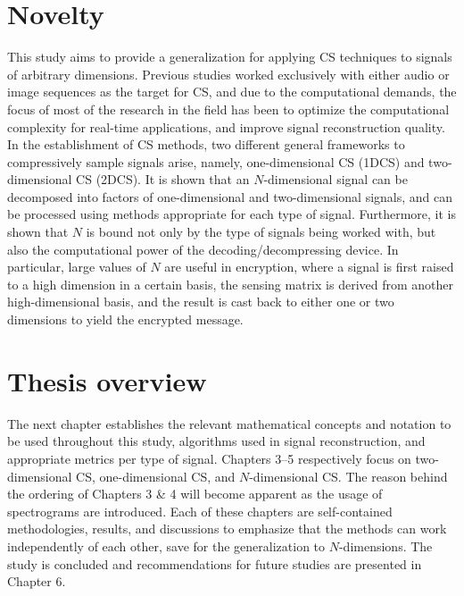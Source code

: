 \section{Novelty}
\label{sec:novel}
This study aims to provide a generalization for applying CS techniques to signals of arbitrary dimensions. Previous studies worked exclusively with either audio or image sequences as the target for CS, and due to the computational demands, the focus of most of the research in the field has been to optimize the computational complexity for real-time applications, and improve signal reconstruction quality. In the establishment of CS methods, two different general frameworks to compressively sample signals arise, namely, one-dimensional CS (1DCS) and two-dimensional CS (2DCS). It is shown that an $N$-dimensional signal can be decomposed into factors of one-dimensional and two-dimensional signals, and can be processed using methods appropriate for each type of signal. Furthermore, it is shown that $N$ is bound not only by the type of signals being worked with, but also the computational power of the decoding/decompressing device. In particular, large values of $N$ are useful in encryption, where a signal is first raised to a high dimension in a certain basis, the sensing matrix is derived from another high-dimensional basis, and the result is cast back to either one or two dimensions to yield the encrypted message.


\section{Thesis overview}
\label{sec:overview}
The next chapter establishes the relevant mathematical concepts and notation to be used throughout this study, algorithms used in signal reconstruction, and appropriate metrics per type of signal. Chapters 3--5 respectively focus on two-dimensional CS, one-dimensional CS, and $N$-dimensional CS. The reason behind the ordering of Chapters 3 \& 4 will become apparent as the usage of spectrograms are introduced. Each of these chapters are self-contained methodologies, results, and discussions to emphasize that the methods can work independently of each other, save for the generalization to $N$-dimensions. The study is concluded and recommendations for future studies are presented in Chapter 6.